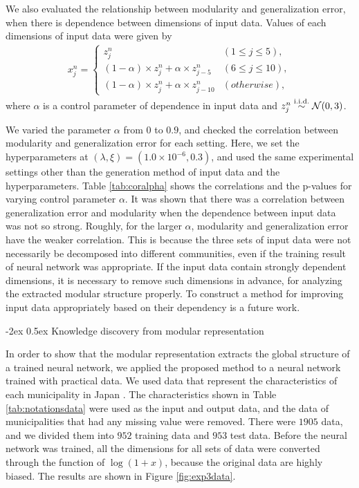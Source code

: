 \documentclass[12pt]{article} %
\makeatletter
\renewcommand\subsection{\@startsection {subsection}{1}%
{\z@}%
{-2ex}%
{0.5ex}%
{\normalfont\normalsize\itshape}}
\makeatother
\begin{document}
We also evaluated the relationship between modularity and generalization error, when there is dependence between dimensions of input data. Values of each dimensions of input data were given by
\begin{eqnarray}
  x^n_j = \begin{cases}
    z^n_j & (1 \leq j \leq 5), \\
    (1-\alpha)\times z^n_j +\alpha \times z^n_{j-5} & (6 \leq j \leq 10),\\
    (1-\alpha)\times z^n_j +\alpha \times z^n_{j-10} & (otherwise),
  \end{cases}  
  \label{eq:alpha}
\end{eqnarray}
where $\alpha$ is a control parameter of dependence in input data and $z^n_j\overset{\text\small\rm{i.i.d.}}{\sim}\mathcal{N}(0,3)$. 

We varied the parameter $\alpha$ from $0$ to $0.9$, and checked the correlation between modularity and generalization error for each setting. Here, we set the hyperparameters at $(\lambda, \xi)=(1.0\times 10^{-6},0.3)$, and used the same experimental settings other than the generation method of input data and the hyperparameters. 
Table \ref{tab:coralpha} shows the correlations and the p-values for varying control parameter $\alpha$. 
It was shown that there was a correlation between generalization error and modularity when the dependence between input data was not so strong. Roughly, for the larger $\alpha$, modularity and generalization error have the weaker correlation. This is because the three sets of input data were not necessarily be decomposed into different communities, even if the training result of neural network was appropriate. If the input data contain strongly dependent dimensions, it is necessary to remove such dimensions in advance, for analyzing the extracted modular structure properly. To construct a method for improving input data appropriately based on their dependency is a future work. 

\subsection{Knowledge discovery from modular representation} %
\label{sec:kd}

In order to show that the modular representation extracts the global structure of a trained neural network, we applied the proposed method to a neural network trained with practical data. We used data that represent the characteristics of each municipality in Japan \cite{estat}. The characteristics shown in Table \ref{tab:notationsdata} were used as the input and output data, and the data of municipalities that had any missing value were removed. There were $1905$ data, and we divided them into $952$ training data and $953$ test data. Before the neural network was trained, all the dimensions for all sets of data were converted through the function of $\log (1+x)$, because the original data are highly biased. The results are shown in Figure \ref{fig:exp3data}.
\end{document}

